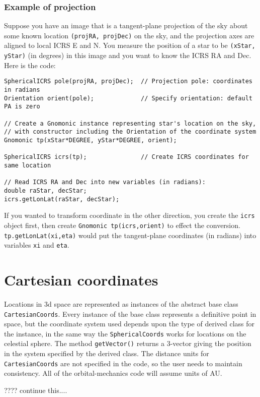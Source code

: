 \documentclass[11pt,preprint,flushrt]{aastex}
\begin{document}
\subsubsection{Example of projection}
Suppose you have an image that is a tangent-plane projection of the sky about some known location {\tt (projRA, projDec)} on the sky, and the projection axes are aligned to local ICRS E and N.  You measure the position of a star to be {\tt (xStar, yStar)} (in degrees) in this image and you want to know the ICRS RA and Dec.  Here is the code:
\begin{verbatim}
SphericalICRS pole(projRA, projDec);  // Projection pole: coordinates in radians
Orientation orient(pole);             // Specify orientation: default PA is zero

// Create a Gnomonic instance representing star's location on the sky,
// with constructor including the Orientation of the coordinate system
Gnomonic tp(xStar*DEGREE, yStar*DEGREE, orient);

SphericalICRS icrs(tp);               // Create ICRS coordinates for same location

// Read ICRS RA and Dec into new variables (in radians):
double raStar, decStar;
icrs.getLonLat(raStar, decStar);
\end{verbatim}
If you wanted to transform coordinate in the other direction, you create the {\tt icrs} object first, then create {\tt Gnomonic tp(icrs,orient)} to effect the conversion.  {\tt tp.getLonLat(xi,eta)} would put the tangent-plane coordinates (in radians) into variables {\tt xi} and {\tt eta}.

\section{Cartesian coordinates}
Locations in 3d space are represented as instances of the abstract base class {\tt CartesianCoords}. Every instance of the base class represents a definitive point in space, but the coordinate system used depends upon the type of derived class for the instance, in the same way the {\tt SphericalCoords} works for locations on the celestial sphere.  The method {\tt getVector()} returns a 3-vector giving the position in the system specified by the derived class.  The distance units for {\tt CartesianCoords} are not specified in the code, so the user needs to maintain consistency.  All of the orbital-mechanics code will assume units of AU.

???? continue this....
\end{document}
